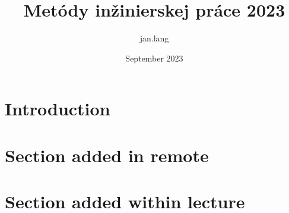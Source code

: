 \documentclass{article}
\title{Metódy inžinierskej práce 2023}
\author{jan.lang }
\date{September 2023}
\begin{document}
\maketitle

\section{Introduction}
\section{Section added in remote}

\section{Section added within lecture}

\Blinddocument
\end{document}
